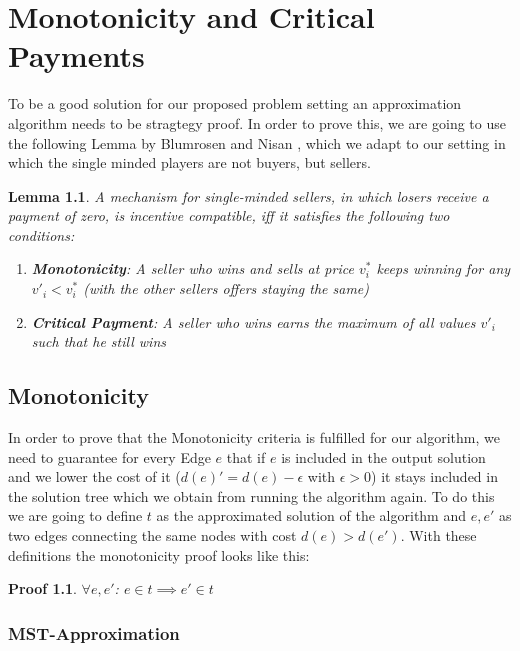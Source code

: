 
\newtheorem{lemma}{Lemma}
\newtheorem{myproof}{Proof}
\chapter{Monotonicity and Critical Payments}\label{chapter:monotonicity&criticalpayment}


To be a good solution for our proposed problem setting an approximation algorithm needs to be stragtegy proof. In order to prove this, we are going to use the following Lemma by Blumrosen and Nisan \cite{BlNi07}, which we adapt to our setting in which the single minded players are not buyers, but sellers.
\begin{lemma}
A mechanism for single-minded sellers, in which losers receive a payment of zero, is incentive compatible, iff it satisfies the following two conditions:
\begin{enumerate}[label=\roman*)]
            \item \textbf{Monotonicity}: A seller who wins and sells at price $v_i^*$ keeps winning for any $v'_i<v_i^*$ (with the other sellers offers staying the same)
            \item \textbf{Critical Payment}: A seller who wins earns the maximum of all values $v'_i$ such that he still wins
\end{enumerate}
\end{lemma} 

\section{Monotonicity}

In order to prove that the Monotonicity criteria is fulfilled for our algorithm, we need to guarantee for every Edge $e$ that if $e$ is included in the output solution and we lower the cost of it ($d(e)'=d(e)-\epsilon$ with $\epsilon > 0$) it stays included in the solution tree which we obtain from running the algorithm again. To do this we are going to define $t$ as the approximated solution of the algorithm and $e, e'$ as two edges connecting the same nodes with cost $d(e)>d(e')$. With these definitions the monotonicity proof looks like this: 
\begin{myproof}
$\forall e, e'$: $e\in t \implies e'\in t$
\end{myproof}

\subsection{MST-Approximation}


